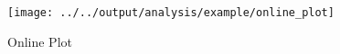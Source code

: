 \begin{figure}[H]
\caption{Online Plot\label{fig:online_plot}}

\centering{}\texttt{[image: ../../output/analysis/example/online\_plot]}
\end{figure}

\clearpage

